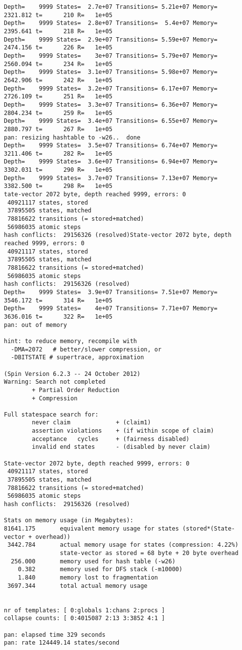 \documentclass{llncs}
\begin{document}
\begin{lstlisting}
Depth=    9999 States=  2.7e+07 Transitions= 5.21e+07 Memory=  2321.812 t=      210 R=   1e+05
Depth=    9999 States=  2.8e+07 Transitions=  5.4e+07 Memory=  2395.641 t=      218 R=   1e+05
Depth=    9999 States=  2.9e+07 Transitions= 5.59e+07 Memory=  2474.156 t=      226 R=   1e+05
Depth=    9999 States=    3e+07 Transitions= 5.79e+07 Memory=  2560.094 t=      234 R=   1e+05
Depth=    9999 States=  3.1e+07 Transitions= 5.98e+07 Memory=  2642.906 t=      242 R=   1e+05
Depth=    9999 States=  3.2e+07 Transitions= 6.17e+07 Memory=  2726.109 t=      251 R=   1e+05
Depth=    9999 States=  3.3e+07 Transitions= 6.36e+07 Memory=  2804.234 t=      259 R=   1e+05
Depth=    9999 States=  3.4e+07 Transitions= 6.55e+07 Memory=  2880.797 t=      267 R=   1e+05
pan: resizing hashtable to -w26..  done
Depth=    9999 States=  3.5e+07 Transitions= 6.74e+07 Memory=  3211.406 t=      282 R=   1e+05
Depth=    9999 States=  3.6e+07 Transitions= 6.94e+07 Memory=  3302.031 t=      290 R=   1e+05
Depth=    9999 States=  3.7e+07 Transitions= 7.13e+07 Memory=  3382.500 t=      298 R=   1e+05
tate-vector 2072 byte, depth reached 9999, errors: 0
 40921117 states, stored
 37895505 states, matched
 78816622 transitions (= stored+matched)
 56986035 atomic steps
hash conflicts:  29156326 (resolved)State-vector 2072 byte, depth reached 9999, errors: 0
 40921117 states, stored
 37895505 states, matched
 78816622 transitions (= stored+matched)
 56986035 atomic steps
hash conflicts:  29156326 (resolved)
Depth=    9999 States=  3.9e+07 Transitions= 7.51e+07 Memory=  3546.172 t=      314 R=   1e+05
Depth=    9999 States=    4e+07 Transitions= 7.71e+07 Memory=  3636.016 t=      322 R=   1e+05
pan: out of memory

hint: to reduce memory, recompile with
  -DMA=2072   # better/slower compression, or
  -DBITSTATE # supertrace, approximation

(Spin Version 6.2.3 -- 24 October 2012)
Warning: Search not completed
        + Partial Order Reduction
        + Compression

Full statespace search for:
        never claim             + (claim1)
        assertion violations    + (if within scope of claim)
        acceptance   cycles     + (fairness disabled)
        invalid end states      - (disabled by never claim)

State-vector 2072 byte, depth reached 9999, errors: 0
 40921117 states, stored
 37895505 states, matched
 78816622 transitions (= stored+matched)
 56986035 atomic steps
hash conflicts:  29156326 (resolved)

Stats on memory usage (in Megabytes):
81641.175       equivalent memory usage for states (stored*(State-vector + overhead))
 3442.784       actual memory usage for states (compression: 4.22%)
                state-vector as stored = 68 byte + 20 byte overhead
  256.000       memory used for hash table (-w26)
    0.382       memory used for DFS stack (-m10000)
    1.840       memory lost to fragmentation
 3697.344       total actual memory usage


nr of templates: [ 0:globals 1:chans 2:procs ]
collapse counts: [ 0:4015087 2:13 3:3852 4:1 ]

pan: elapsed time 329 seconds
pan: rate 124449.14 states/second
\end{lstlisting}
\end{document}
